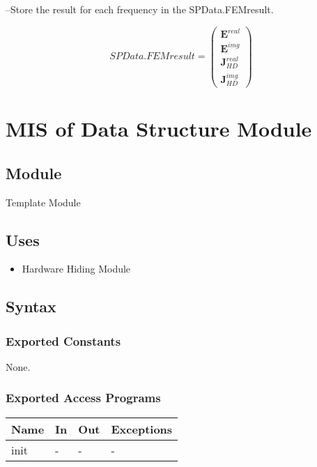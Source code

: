 \documentclass[12pt, titlepage]{article}
\begin{document}
\begin{itemize}
		
		\subitem --Store the result for each frequency in the SPData.FEMresult.
		
		\begin{equation*} SPData.FEMresult = \begin{pmatrix} \textbf{E}^{real}\\
				\textbf{E}^{img}\\ \textbf{J}^{real}_{HD}\\ \textbf{J}^{img}_{HD} \end{pmatrix}
		\end{equation*}
		
	\end{itemize}
	
	\newpage %
	\section{MIS of Data Structure Module} \label{DSM}
	
	\subsection{Module} 
	Template Module
	
	\subsection{Uses} \begin{itemize} \item Hardware Hiding Module \end{itemize}
	
	\subsection{Syntax}
	
	\subsubsection{Exported Constants} None. \subsubsection{Exported Access
		Programs}
	
	\begin{center} \begin{tabular}{p{2cm} p{4cm} p{4cm} p{2cm}} \hline \textbf{Name}
			& \textbf{In} & \textbf{Out} & \textbf{Exceptions} \\ \hline init & - & - & - \\
			\hline \end{tabular} \end{center}
	
\end{document}
